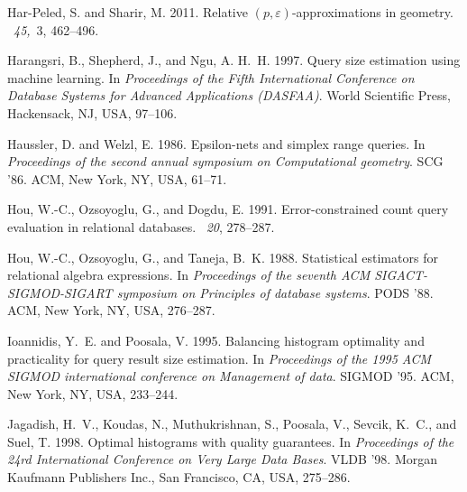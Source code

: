 \begin{thebibliography}{}
{\sc Har-Peled, S.} {\sc and} {\sc Sharir, M.} 2011.
\newblock Relative $(p,\varepsilon)$-approximations in geometry.
~{\em 45,\/}~3, 462--496.

{\sc Harangsri, B.}, {\sc Shepherd, J.}, {\sc and} {\sc Ngu, A. H.~H.} 1997.
\newblock Query size estimation using machine learning.
\newblock In {\em Proceedings of the Fifth International Conference on Database
  Systems for Advanced Applications (DASFAA)}. World Scientific Press,
  Hackensack, NJ, USA, 97--106.

{\sc Haussler, D.} {\sc and} {\sc Welzl, E.} 1986.
\newblock Epsilon-nets and simplex range queries.
\newblock In {\em Proceedings of the second annual symposium on Computational
  geometry}. SCG '86. ACM, New York, NY, USA, 61--71.

{\sc Hou, W.-C.}, {\sc Ozsoyoglu, G.}, {\sc and} {\sc Dogdu, E.} 1991.
\newblock Error-constrained count query evaluation in relational databases.
~{\em 20}, 278--287.

{\sc Hou, W.-C.}, {\sc Ozsoyoglu, G.}, {\sc and} {\sc Taneja, B.~K.} 1988.
\newblock Statistical estimators for relational algebra expressions.
\newblock In {\em Proceedings of the seventh ACM SIGACT-SIGMOD-SIGART symposium
  on Principles of database systems}. PODS '88. ACM, New York, NY, USA,
  276--287.

{\sc Ioannidis, Y.~E.} {\sc and} {\sc Poosala, V.} 1995.
\newblock Balancing histogram optimality and practicality for query result size
  estimation.
\newblock In {\em Proceedings of the 1995 ACM SIGMOD international conference
  on Management of data}. SIGMOD '95. ACM, New York, NY, USA, 233--244.

{\sc Jagadish, H.~V.}, {\sc Koudas, N.}, {\sc Muthukrishnan, S.}, {\sc Poosala,
  V.}, {\sc Sevcik, K.~C.}, {\sc and} {\sc Suel, T.} 1998.
\newblock Optimal histograms with quality guarantees.
\newblock In {\em Proceedings of the 24rd International Conference on Very
  Large Data Bases}. VLDB '98. Morgan Kaufmann Publishers Inc., San Francisco,
  CA, USA, 275--286.


\end{thebibliography}

